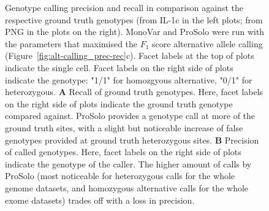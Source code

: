 \documentclass[authoryear,preprint,11pt]{scrartcl}
\begin{document}
\begin{figure}[!tpb]
\begin{minipage}{.53\linewidth}
 \end{minipage}
 \caption{
  Genotype calling precision and recall in comparison against the respective ground truth genotypes (from IL-1c in the left plots; from PNG in the plots on the right).
  MonoVar and ProSolo were run with the parameters that maximised the $F_1$ score alternative allele calling (Figure~\ref{fig:alt-calling_prec-rec}c).
  Facet labels at the top of plots indicate the single cell.
  Facet labels on the right side of plots indicate the genotype:
  "1/1" for homozgyous alternative, "0/1" for heterozygous.
  \textbf{A} Recall of ground truth genotypes.
  Here, facet labels on the right side of plots indicate the ground truth genotype compared against.
  ProSolo provides a genotype call at more of the ground truth sites, with a slight but noticeable increase of false genotypes provided at ground truth heterozygous sites.
  \textbf{B} Precision of called genotypes.
  Here, facet labels on the right side of plots indicate the genotype of the caller.
  The higher amount of calls by ProSolo (most noticeable for heterozygous calls for the whole genome datasets, and homozygous alternative calls for the whole exome datasets) trades off with a loss in precision.
  }
\label{fig:gt-calling-true-false-colouring}
\end{figure}
\end{document}
